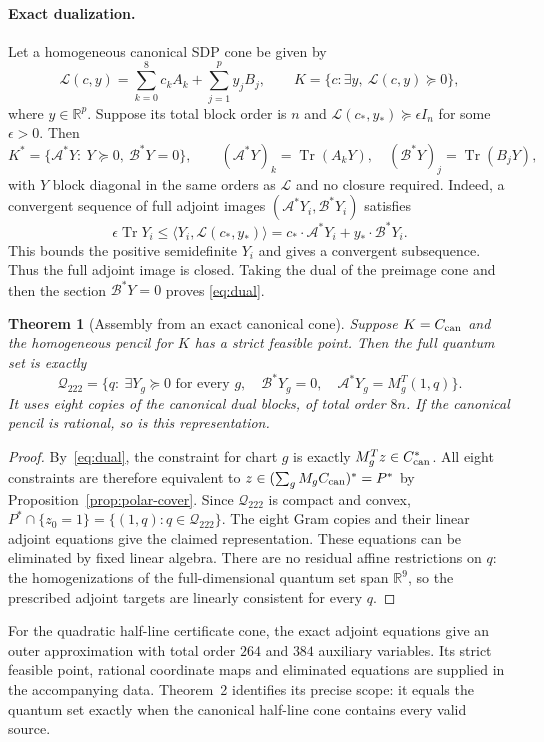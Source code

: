 \documentclass[11pt]{article}
\newtheorem{theorem}[proposition]{Theorem}
\newcommand{\R}{\mathbb R}
\begin{document}
\paragraph{Exact dualization.}
Let a homogeneous canonical SDP cone be given by
\[
 \mathcal L(c,y)=\sum_{k=0}^8c_k A_k+\sum_{j=1}^{p}y_j B_j,
 \qquad K=\{c:\exists y,\ \mathcal L(c,y)\succeq0\},
\]
where $y\in\R^p$. Suppose its total block order is $n$ and
$\mathcal L(c_*,y_*)\succeq\epsilon I_n$ for some $\epsilon>0$.
Then
\begin{equation}
 K^*=\{\mathcal A^*Y:\ Y\succeq0,\ \mathcal B^*Y=0\},\qquad
 (\mathcal A^*Y)_k=\operatorname{Tr}(A_kY),\quad
 (\mathcal B^*Y)_j=\operatorname{Tr}(B_jY),              \label{eq:dual}
\end{equation}
with $Y$ block diagonal in the same orders as $\mathcal L$ and no closure required.
Indeed, a convergent sequence of full adjoint images
$(\mathcal A^*Y_i,\mathcal B^*Y_i)$ satisfies
\[
 \epsilon\operatorname{Tr}Y_i
 \le\langle Y_i,\mathcal L(c_*,y_*)\rangle
 =c_*\cdot\mathcal A^*Y_i+y_*\cdot\mathcal B^*Y_i.
\]
This bounds the positive semidefinite $Y_i$ and gives a convergent
subsequence. Thus the full adjoint image is closed. Taking the dual
of the preimage cone and then the section $\mathcal B^*Y=0$ proves
\eqref{eq:dual}.

\begin{theorem}[Assembly from an exact canonical cone]\label{thm:conditional}
Suppose $K=C_{\rm can}$ and the homogeneous pencil for $K$ has a strict
feasible point. Then the full quantum set is exactly
\begin{equation}
 \mathcal Q_{222}=\{q:\ \exists Y_g\succeq0\text{ for every }g,\quad
       \mathcal B^*Y_g=0,\quad\mathcal A^*Y_g=M_g^T(1,q)\}.
                                                               \label{eq:generic-primal}
\end{equation}
It uses eight copies of the canonical dual blocks, of total order $8n$.
If the canonical pencil is rational, so is this representation.
\end{theorem}
\begin{proof}
By~\eqref{eq:dual}, the constraint for chart $g$ is exactly
$M_g^Tz\in C_{\rm can}^*$. All eight constraints are therefore equivalent
to $z\in(\sum_gM_gC_{\rm can})^*=P^*$ by
Proposition~\ref{prop:polar-cover}. Since $\mathcal Q_{222}$ is compact and
convex, $P^*\cap\{z_0=1\}=\{(1,q):q\in\mathcal Q_{222}\}$.
The eight Gram copies and their linear adjoint equations give the
claimed representation. These equations can be eliminated by fixed
linear algebra. There are no residual affine restrictions on $q$:
the homogenizations of the full-dimensional quantum set span $\R^9$,
so the prescribed adjoint targets are linearly consistent for every $q$.
\end{proof}

For the quadratic half-line certificate cone, the exact adjoint equations
give an outer approximation with total order $264$ and $384$ auxiliary
variables. Its strict feasible point, rational coordinate maps and
eliminated equations are supplied in the accompanying data. Theorem~2
identifies its precise scope: it equals the quantum set exactly when
the canonical half-line cone contains every valid source.
\end{document}
